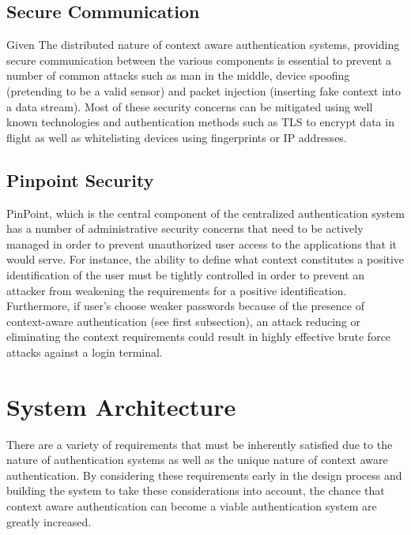 \documentclass[11pt,journal]{IEEEtran}
\begin{document}
\subsection{Secure Communication}
Given The distributed nature of context aware authentication systems, providing secure communication between the various components is essential to prevent a number of common attacks such as man in the middle, device spoofing (pretending to be a valid sensor) and packet injection (inserting fake context into a data stream).  Most of these security concerns can be mitigated using well known technologies and authentication methods such as TLS to encrypt data in flight as well as whitelisting devices using fingerprints or IP addresses.

\subsection{Pinpoint Security}
PinPoint, which is the central component of the centralized authentication system has a number of administrative security concerns that need to be actively managed in order to prevent unauthorized user access to the applications that it would serve.  For instance, the ability to define what context constitutes a positive identification of the user must be tightly controlled in order to prevent an attacker from weakening the requirements for a positive identification.  Furthermore, if user's choose weaker passwords because of the presence of context-aware authentication (see first subsection), an attack reducing or eliminating the context requirements could result in highly effective brute force attacks against a login terminal. 

\section{System Architecture}
There are a variety of requirements that must be inherently satisfied due to the nature of authentication systems as well as the unique nature of context aware authentication.  By considering these requirements early in the design process and building the system to take these considerations into account, the chance that context aware authentication can become a viable authentication system are greatly increased.
\end{document}

